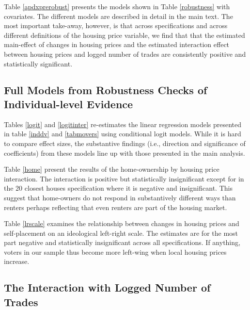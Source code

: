 \documentclass[12pt,a4paper]{article}
\begin{document}
	Table \ref{apdxprerobust} presents the models shown in Table \ref{robustness} with covariates. The different models are described in detail in the main text. The most important take-away, however, is that across specifications and across different definitions of the housing price variable, we find that that the estimated main-effect of changes in housing prices  and the estimated interaction effect between housing prices and logged number of trades are consistently positive and statistically significant.
	
	
	 
	
	\newpage
	
	\subsection{Full Models from Robustness Checks of Individual-level Evidence} \label{app_robustind}
	
	\setcounter{table}{0}
	
	Tables \ref{logit} and \ref{logitinter} re-estimates the linear regression models presented in table \ref{inddv} and \ref{tabmovers} using conditional logit models. While it is hard to compare effect sizes, the substantive findings (i.e., direction and significance of coefficients) from these models line up with those presented in the main analysis.
	
	Table  \ref{home} present the results of the home-ownership by housing price interaction. The interaction is positive but statistically insignificant except for in the 20 closest houses specification where it is negative and insignificant. This suggest that home-owners do not respond in substantively different ways than renters perhaps reflecting that even renters are part of the housing market.
	
	Table \ref{lrscale} examines the relationship between changes in housing prices and  self-placement on an ideological left-right scale. The estimates are for the most part negative and statistically insignificant across all specifications. If anything, voters in our sample thus become more left-wing when local housing prices increase.
	
	
	
	
	
	
	\clearpage
	
	\subsection{The Interaction with Logged Number of Trades} \label{app_interaction}
	\setcounter{table}{0}
	\setcounter{figure}{0}
	
\end{document}
